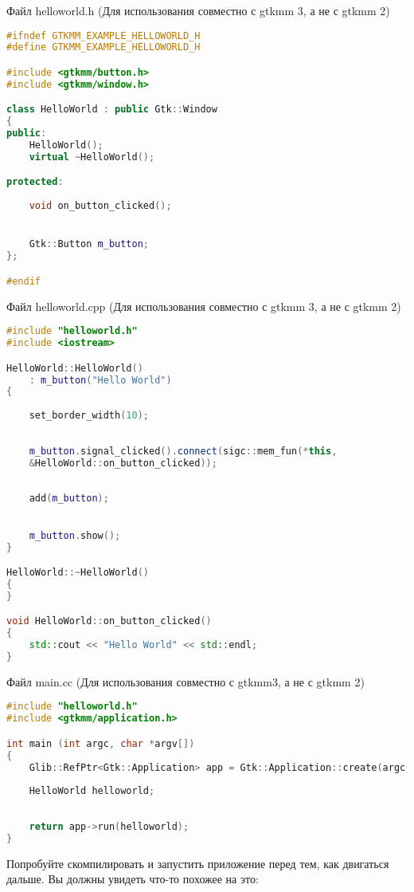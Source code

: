 Файл helloworld.h (Для использования совместно с gtkmm 3, а не с gtkmm 2) 
\begin{lstlisting}[language=C++]
#ifndef GTKMM_EXAMPLE_HELLOWORLD_H
#define GTKMM_EXAMPLE_HELLOWORLD_H

#include <gtkmm/button.h>
#include <gtkmm/window.h>

class HelloWorld : public Gtk::Window
{
public:
	HelloWorld();
	virtual ~HelloWorld();

protected:
	
	void on_button_clicked();


	Gtk::Button m_button;
};

#endif 
\end{lstlisting}
Файл helloworld.cpp (Для использования совместно с gtkmm 3, а не с gtkmm 2) 
\begin{lstlisting}[language=C++]
#include "helloworld.h"
#include <iostream>

HelloWorld::HelloWorld()
	: m_button("Hello World")   
{
	
	set_border_width(10);
	
	
	m_button.signal_clicked().connect(sigc::mem_fun(*this,
	&HelloWorld::on_button_clicked));
	
	
	add(m_button);
	

	m_button.show();
}

HelloWorld::~HelloWorld()
{
}

void HelloWorld::on_button_clicked()
{
	std::cout << "Hello World" << std::endl;
}

\end{lstlisting}
Файл main.cc (Для использования совместно с gtkmm3, а не с gtkmm 2) 
\begin{lstlisting}[language=C++]
#include "helloworld.h"
#include <gtkmm/application.h>

int main (int argc, char *argv[])
{
	Glib::RefPtr<Gtk::Application> app = Gtk::Application::create(argc, argv, "org.gtkmm.example");
	
	HelloWorld helloworld;
	
	
	return app->run(helloworld);
}
\end{lstlisting}
Попробуйте скомпилировать и запустить приложение перед тем, как двигаться дальше. Вы должны увидеть что-то похожее на это:


